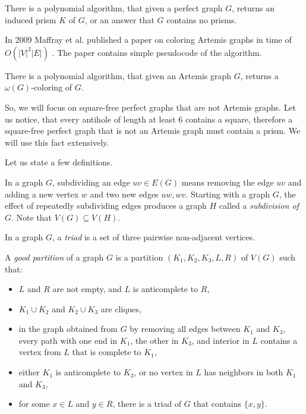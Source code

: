 \begin{theorem}{\cite{Maffray2005}}
  \label{thm:getPrism}
  There is a polynomial algorithm, that given a perfect graph $G$, returns an induced prism $K$ of $G$, or an answer that $G$ contains no prisms.
\end{theorem}


In 2009 Maffray et al. published a paper on coloring Artemis graphs in time of $O(|V|^2|E|)$ \cite{coloringArtemis}. The paper contains simple pseudocode of the algorithm.

\begin{theorem}{\cite{coloringArtemis}}
  \label{thm:colorArtemis}
  There is a polynomial algorithm, that given an Artemis graph $G$, returns a $\omega(G)$-coloring of $G$.
\end{theorem}

So, we will focus on square-free perfect graphs that are not Artemis graphs. Let us notice, that every antihole of length at least 6 contains a square, therefore a square-free perfect graph that is not an Artemis graph must contain a prism. We will use this fact extensively.

Let us state a few definitions.

\begin{defnTwo}[subdivision]
  In a graph $G$, subdividing an edge $uv \in E(G)$ means removing the edge $uv$ and adding a new vertex $w$ and two new edges $uw, wv$. Starting with a graph $G$, the effect of repeatedly subdividing edges produces a graph $H$ called a \emph{subdivision of $G$}. Note that $V(G) \subseteq V(H)$.
\end{defnTwo}

\begin{defnTwo}[triad]
  In a graph $G$, a \emph{triad} is a set of three pairwise non-adjacent vertices.
\end{defnTwo}

\begin{defnTwo}
  A \emph{good partition} of a graph $G$ is a partition $(K_1, K_2, K_3, L, R)$ of $V(G)$ such that:
  \begin{itemize}
    \item $L$ and $R$ are not empty, and $L$ is anticomplete to $R$,
    \item $K_1 \cup K_2$ and $K_2 \cup K_3$ are cliques,
    \item in the graph obtained from $G$ by removing all edges between $K_1$ and $K_3$, every path with one end in $K_1$, the other in $K_3$, and interior in $L$ contains a vertex from $L$ that is complete to $K_1$,
    \item either $K_1$ is anticomplete to $K_3$, or no vertex in $L$ has neighbors in both $K_1$ and $K_3$,
    \item for some $x \in L$ and $y \in R$, there is a triad of $G$ that contains $\{x, y\}$.
  \end{itemize}
\end{defnTwo}


